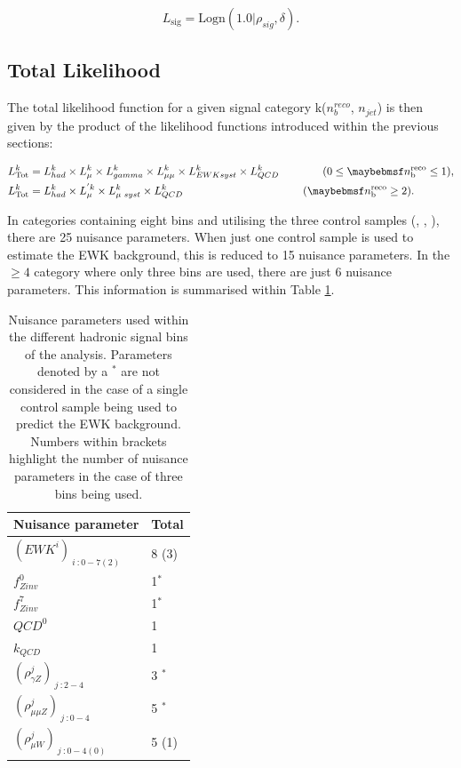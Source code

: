 \begin{equation}
L_{\text{sig}} = \text{Logn}(1.0|\rho_{sig},\delta).
\end{equation}

\subsection{Total Likelihood}
\label{subsec:totallikelihood}

The total likelihood function for a given signal category k($n_{b}^{reco}$, $n_{jet}$) is then given by the product of the likelihood functions introduced within the previous sections:

\begin{align}
L^{k}_{\text{Tot}} &= L^{k}_{had} \times  L^{k}_{\mu} \times  L^{k}_{\gamma} \times  L^{k}_{\mu\mu} \times  L^{k}_{EWK syst} \times  L^{k}_{QCD}  \qquad\qquad (0 \leq \nbreco \leq 1), \nonumber \\
L^{k}_{\text{Tot}} &= L^{k}_{had} \times  L^{'\xspace k }_{\mu} \times  L^{k}_{\mu\text{ }syst} \times  L^{k}_{QCD} \quad\qquad\qquad\qquad\qquad\qquad(\nbreco \geq 2).
\label{eq:totallikelihoodfunc}
\end{align}

In categories containing eight \theht bins and utilising the three control samples (\mupjets, \dimupjets, \gpjets), there are 25 nuisance parameters. When just one control sample is used to estimate the \ac{EWK} background, this is reduced to 15 nuisance parameters. In the \nbreco$\geq4$ category where only three \theht bins are used, there are just 6 nuisance parameters. This information is summarised within Table \ref{tab:nuisanceparameters}.

 \begin{table}[h!]
 \footnotesize
\begin{center}
\begin{tabular*}{0.45\textwidth}{@{\extracolsep{\fill}}ll}
\hline
Nuisance parameter & Total \\
\hline\hline
$(EWK^{i})_{\ i\ : 0-7(2)}$ & 8 (3) \\
$f^{0}_{Zinv}$  & 1$^{*}$ \\
 $f^{7}_{Zinv}$  &1$^{*}$ \\
 $QCD^{0}$ & 1 \\
 $k_{QCD}$ & 1 \\
 $(\rho^{j}_{\gamma Z})_{\ j \ : 2-4}$  & 3 $^{*}$\\
 $(\rho^{j}_{\mu\mu Z})_{\ j \ : 0-4}$   & 5 $^{*}$ \\
 $(\rho^{j}_{\mu W})_{\ j \ : 0-4(0)}$ & 5 (1) \\
\end{tabular*}
\end{center}
\caption[Nuisance parameters used within the different hadronic signal bins of the analysis]{Nuisance parameters used within the different hadronic signal bins of the analysis. Parameters denoted by a $^{*}$ are not considered in the case of a single control sample being used to predict the \ac{EWK} background. Numbers within brackets highlight the number of nuisance parameters in the case of three \theht bins being used.}\label{tab:nuisanceparameters}
\end{table}

